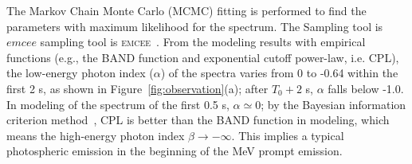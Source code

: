 \documentclass[linenumbers,twocolumn]{aastex631}
\providecommand{\DIFaddtex}[1]{{\protect\color{blue} \sf #1}} %
\providecommand{\DIFdeltex}[1]{{\protect\color{red} \scriptsize #1}} %
\providecommand{\DIFaddbegin}{} %
\providecommand{\DIFaddend}{} %
\providecommand{\DIFdelbegin}{} %
\providecommand{\DIFdelend}{} %
\providecommand{\DIFadd}[1]{\texorpdfstring{\DIFaddtex{#1}}{#1}} %
\providecommand{\DIFdel}[1]{\texorpdfstring{\DIFdeltex{#1}}{}} %
\begin{document}
The Markov Chain Monte Carlo (MCMC) fitting is performed to find the parameters with maximum likelihood for the spectrum. The \DIFdelbegin \DIFdel{Sampling tool is $emcee$}\DIFdelend \DIFaddbegin \DIFadd{sampling tool is \textsc{emcee}}\DIFaddend ~\citep{2013PASP..125..306F}.
From the modeling results with empirical functions (e.g., the BAND function and exponential cutoff power-law, i.e. CPL), the low-energy photon index ($\alpha$) of the spectra varies from 0 to -0.64 within the first 2 s, as shown in Figure~\ref{fig:observation}(a); after $T_0 +2$ s, $\alpha$ falls below -1.0.  In modeling of the spectrum of the first 0.5 s, $\alpha\simeq 0$; by the Bayesian information criterion method~\citep[BIC,][]{2016MNRAS.463.1144W}, CPL is better than the BAND function in modeling, which means the high-energy photon index $\beta\to-\infty$. This implies a typical photospheric emission in the beginning of the MeV prompt emission.
\end{document}
